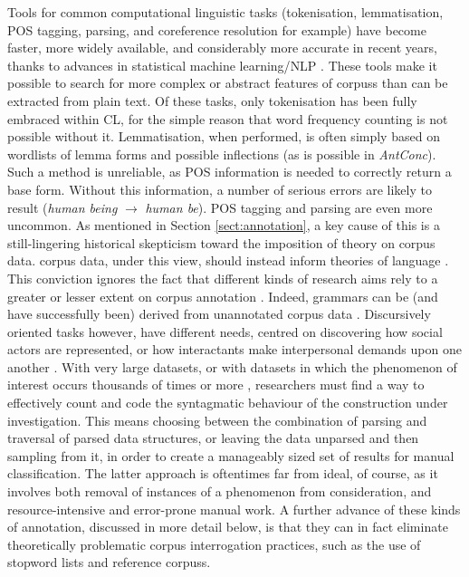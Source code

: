 Tools for common computational linguistic tasks (tokenisation, lemmatisation, \gls{POS} tagging, parsing, and coreference resolution for example) have become faster, more widely available, and considerably more accurate in recent years, thanks to advances in statistical machine learning\slash \gls{NLP} \cite{manning1999foundations}. These tools make it possible to search for more complex or abstract features of \glspl{corpus} than can be extracted from plain text. Of these tasks, only tokenisation has been fully embraced within \gls{CL}, for the simple reason that word frequency counting is not possible without it. Lemmatisation, when performed, is often simply based on wordlists of lemma forms and possible inflections (as is possible in \emph{AntConc}). Such a method is unreliable, as \gls{POS} information is needed to correctly return a base form. Without this information, a number of serious errors are likely to result (\emph{human being} $\rightarrow$ \emph{human be}). \gls{POS} tagging and parsing are even more uncommon. As mentioned in Section \ref{sect:annotation}, a key cause of this is a still\hyp{}lingering historical skepticism toward the imposition of theory on \gls{corpus} data. \Gls{corpus} data, under this view, should instead inform theories of language \cite[e.g.][]{sinclair_trust_2004}. This conviction ignores the fact that different kinds of research aims rely to a greater or lesser extent on \gls{corpus} annotation \cite{anthony_critical_2013}. Indeed, grammars can be (and have successfully been) derived from unannotated \gls{corpus} data \cite[e.g.][]{hunston_pattern_2000}. Discursively oriented tasks however, have different needs, centred on discovering how social actors are represented, or how interactants make interpersonal demands upon one another \cite{gee_introduction_2013}. With very large datasets, or with datasets in which the phenomenon of interest occurs thousands of times or more \cite{zinn_changing_2015}, researchers must find a way to effectively count and code the syntagmatic behaviour of the construction under investigation. This means choosing between the combination of parsing and traversal of parsed data structures, or leaving the data unparsed and then sampling from it, in order to create a manageably sized set of results for manual classification. The latter approach is oftentimes far from ideal, of course, as it involves both removal of instances of a phenomenon from consideration, and resource\hyp{}intensive and error\hyp{}prone manual work. A further advance of these kinds of annotation, discussed in more detail below, is that they can in fact eliminate theoretically problematic \gls{corpus} interrogation practices, such as the use of stopword lists and reference \glspl{corpus}.

